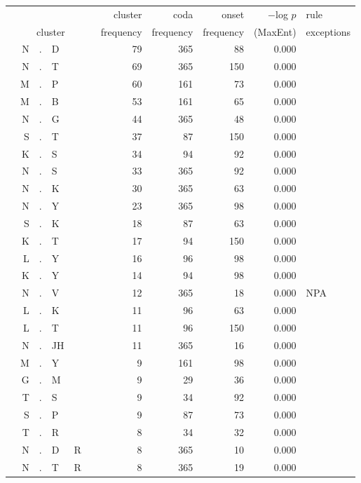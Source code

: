 \label{clusters}

\begin{longtable}{r@{ } r@{ } c@{ } l@{ } l@{ } l@{ } r r r r l }
\toprule
 &   &   &  &   &  &  cluster  &  coda  &  onset  &  $-$log $p$  &  rule \\
\multicolumn{6}{c}{cluster}  &  frequency  &  frequency  &  frequency  &  (MaxEnt)  &  exceptions\\ 
\midrule
 & N & . & D &  &  & 79 & 365 & 88 & 0.000 &  \\
 & N & . & T &  &  & 69 & 365 & 150 & 0.000 &  \\
 & M & . & P &  &  & 60 & 161 & 73 & 0.000 &  \\
 & M & . & B &  &  & 53 & 161 & 65 & 0.000 &  \\
 & N & . & G &  &  & 44 & 365 & 48 & 0.000 &  \\
 & S & . & T &  &  & 37 & 87 & 150 & 0.000 &  \\
 & K & . & S &  &  & 34 & 94 & 92 & 0.000 &  \\
 & N & . & S &  &  & 33 & 365 & 92 & 0.000 &  \\
 & N & . & K &  &  & 30 & 365 & 63 & 0.000 &  \\
 & N & . & Y &  &  & 23 & 365 & 98 & 0.000 &  \\
 & S & . & K &  &  & 18 & 87 & 63 & 0.000 &  \\
 & K & . & T &  &  & 17 & 94 & 150 & 0.000 &  \\
 & L & . & Y &  &  & 16 & 96 & 98 & 0.000 &  \\
 & K & . & Y &  &  & 14 & 94 & 98 & 0.000 &  \\
 & N & . & V &  &  & 12 & 365 & 18 & 0.000 & \textsc{NPA} \\
 & L & . & K &  &  & 11 & 96 & 63 & 0.000 &  \\
 & L & . & T &  &  & 11 & 96 & 150 & 0.000 &  \\
 & N & . & JH &  &  & 11 & 365 & 16 & 0.000 &  \\
 & M & . & Y &  &  & 9 & 161 & 98 & 0.000 &  \\
 & G & . & M &  &  & 9 & 29 & 36 & 0.000 &  \\
 & T & . & S &  &  & 9 & 34 & 92 & 0.000 &  \\
 & S & . & P &  &  & 9 & 87 & 73 & 0.000 &  \\
 & T & . & R &  &  & 8 & 34 & 32 & 0.000 &  \\
 & N & . & D & R &  & 8 & 365 & 10 & 0.000 &  \\
 & N & . & T & R &  & 8 & 365 & 19 & 0.000 &  \\

\end{longtable}
